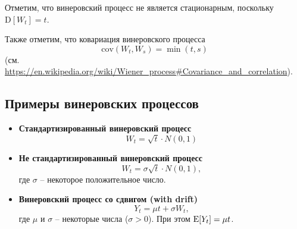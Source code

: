 \documentclass{article}
\begin{document}
Отметим, что винеровский процесс не является стационарным, поскольку $\textrm{D}[W_t] = t$.

Также отметим, что ковариация винеровского процесса
$$\textrm{cov}(W_t, W_s) = \min(t, s)$$
(см. \href{https://en.wikipedia.org/wiki/Wiener_process#Covariance_and_correlation}{https://en.wikipedia.org/wiki/Wiener\_process\#Covariance\_and\_correlation}).


\subsection{Примеры винеровских процессов}
\begin{itemize}
    \item{
        \textbf{Стандартизированный винеровский процесс}
        $$W_t = \sqrt{t} \cdot N(0, 1)$$
    }
    \item{
        \textbf{Не стандартизированный винеровский процесс}
        $$W_t = \sigma \sqrt{t} \cdot N(0, 1),$$
        где $\sigma$ -- некоторое положительное число.
    }
    \item{
        \textbf{Винеровский процесс со сдвигом (with drift)}
        $$Y_t = \mu t + \sigma W_t,$$
        где $\mu$ и $\sigma$ -- некоторые числа ($\sigma > 0$). При этом $\textrm{E}[Y_t] = \mu t$.
    }
\end{itemize}
\end{document}
